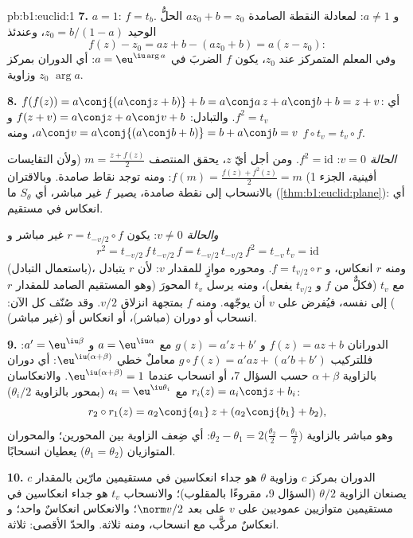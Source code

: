 \begin{solution}{pb:b1:euclid:1}
\textbf{7.} $a = 1$: $f = t_b$. و $a \neq 1$: لمعادلة
النقطة الصامدة $az_0 + b = z_0$ الحلُّ الوحيد $z_0 = b/(1 -
a)$، وعندئذ
\[
f(z) - z_0 = az + b - (az_0 + b) = a(z - z_0):
\]
وفي المعلم المتمركز عند $z_0$، يكون $f$ الضربَ في $a
= \eu^{\iu\arg a}$: أي الدوران بمركز $z_0$ وزاوية
$\arg a$.

\textbf{8.} $f(f(z)) = a\conj{(a\conj z + b)} + b = a\conj a\,z
+ a\conj b + b = z + v$: أي $f^2 = t_v$. والتبادل: $f(z + v) =
a\conj z + a\conj v + b$ و $a\conj v = a\conj{(a\conj b + b)}
= b + a\conj b = v$، ومنه $f\circ t_v = t_v\circ f$.

\emph{الحالة $v = 0$}: $f^2 = \mathrm{id}$. ومن أجل أيّ $z$، يحقق
المنتصف $m = \frac{z + f(z)}2$ (ولأن التقايسات
أفينية، الجزء 1) $f(m) = \frac{f(z) + f^2(z)}{2} = m$: ومنه توجد
نقاط صامدة. وبالاقتران بالانسحاب إلى نقطة صامدة،
يصير $f$   غير مباشر، أي $S_\theta$ ما
(\cref{thm:b1:euclid:plane}): أي انعكاس في مستقيم.

\emph{والحالة $v \neq 0$}: يكون $r = t_{-v/2}\circ f$ غير مباشر و
\[
r^2 = t_{-v/2}\,f\,t_{-v/2}\,f = t_{-v/2}\,t_{-v/2}\,f^2
= t_{-v}\,t_v = \mathrm{id}
\]
(باستعمال التبادل)، ومنه  $r$ انعكاس، و $f =
t_{v/2}\circ r$. ومحوره موازٍ للمقدار $v$: لأن $r$ يتبادل مع
$t_v$ (فكلٌّ من $f$ و $t_{v/2}$ يفعل)، ومنه يرسل $t_v$ المحورَ (وهو
المستقيم الصامد للمقدار $r$) إلى نفسه، فيُفرض على $v$ أن يوجّهه. ومنه
 $f$  بمتجهة انزلاق $v/2$. وقد صُنّف كل
 الآن: انسحاب أو دوران (مباشر)،
أو انعكاس أو  (غير مباشر).

\textbf{9.} الدورانان $f(z) = az + b$ و $g(z) = a'z + b'$ مع
$a = \eu^{\iu\alpha}$ و $a' = \eu^{\iu\beta}$: فللتركيب $g\circ f(z) =
a'az + (a'b + b')$ معاملٌ خطي
$\eu^{\iu(\alpha+\beta)}$: أي دوران بالزاوية $\alpha + \beta$
حسب السؤال 7، أو انسحاب عندما $\eu^{\iu(\alpha+\beta)} =
1$. والانعكاسان $r_i(z) = a_i\conj z + b_i$ مع $a_i =
\eu^{\iu\theta_i}$ (بمحور بالزاوية $\theta_i/2$):
\[
r_2\circ r_1(z) = a_2\conj{a_1}\,z + (a_2\conj{b_1} + b_2),
\]
وهو مباشر بالزاوية $\theta_2 - \theta_1 = 2\bigl(\tfrac{\theta_2}2
- \tfrac{\theta_1}2\bigr)$: أي ضِعف الزاوية بين المحورين؛
والمحوران المتوازيان ($\theta_1 = \theta_2$) يعطيان انسحابًا.

\textbf{10.} الدوران بمركز $c$ وزاوية $\theta$ هو
جداء انعكاسين في مستقيمين مارّين بالمقدار $c$ يصنعان الزاوية
$\theta/2$ (السؤال 9، مقروءًا بالمقلوب)؛ والانسحاب $t_v$ هو
جداء انعكاسين في مستقيمين متوازيين عموديين على
$v$ على بعد $\norm v/2$؛ والانعكاس انعكاسٌ واحد؛ و
 انعكاسٌ مركَّب مع انسحاب،
ومنه ثلاثة. والحدّ الأقصى: ثلاثة.


\end{solution}
